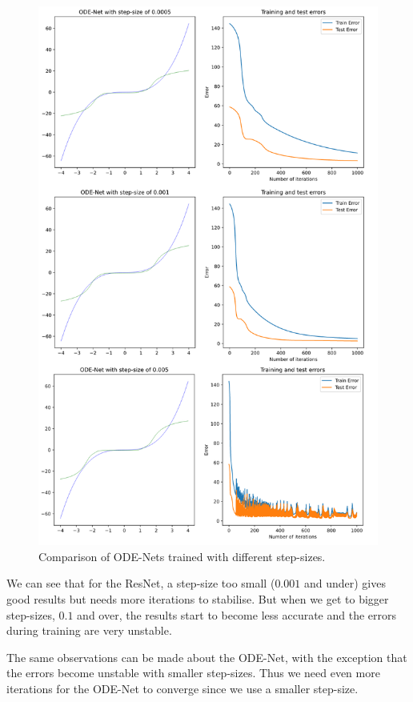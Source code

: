 \documentclass[10pt,a4paper]{article}
\theoremstyle{definition}
\theoremstyle{plain}
\begin{document}
\begin{figure}
\center
\includegraphics[scale=0.4]{odenet_ss.png}
\caption{Comparison of ODE-Nets trained with different step-sizes.}
\label{ode_ss}
\end{figure}

We can see that for the ResNet, a step-size too small ($0.001$ and under) gives good results but needs more iterations to stabilise. But when we get to bigger step-sizes, $0.1$ and over, the results start to become less accurate and the errors during training are very unstable.

The same observations can be made about the ODE-Net, with the exception that the errors become unstable with smaller step-sizes. Thus we need even more iterations for the ODE-Net to converge since we use a smaller step-size.
\end{document}
